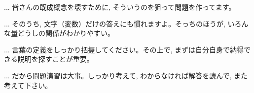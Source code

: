 \begin{faq}{\small{}
... 皆さんの既成概念を壊すために, そういうのを狙って問題を作ってます。}\end{faq}\mv

\begin{faq}{\small{}
 ... そのうち, 文字（変数）だけの答えにも慣れますよ。そっちのほうが, 
いろんな量どうしの関係がわかりやすい。}\end{faq}\mv

\begin{faq}{\small{}
 ... 言葉の定義をしっかり把握してください。その上で, まずは自分自身で納得できる説明を探すことが重要。}\end{faq}\mv

\begin{faq}{\small{}
... だから問題演習は大事。しっかり考えて, わからなければ解答を読んで, また考えて下さい。}\end{faq}\mv

